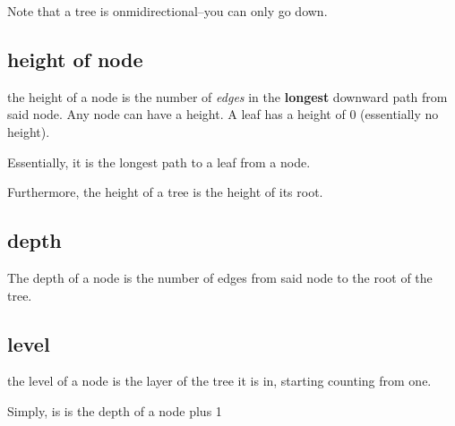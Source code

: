 \documentclass[12pt]{book}
\begin{document}
Note that a tree is onmidirectional--you can only go down.

\subsection*{height of node}
the height of a node is the number of \textit{edges} in the \textbf{longest} downward path from said node.
Any node can have a height. A leaf has a height of 0 (essentially no height).

Essentially, it is the longest path to a leaf from a node.

Furthermore, the height of a tree is the height of its root.

\subsection*{depth}
The depth of a node is the number of edges from said node to the root of the tree.

\subsection*{level}
the level of a node is the layer of the tree it is in, starting counting from one.

Simply, is is the depth of a node plus 1
\end{document}
